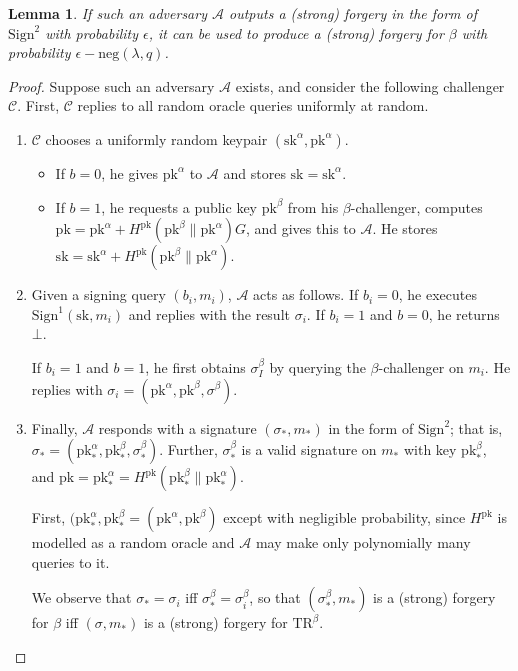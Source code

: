 \documentclass[letterpaper]{article}
\newtheorem{lmma}{Lemma}
\newcommand{\TR}[1]{\mathrm{TR}^{#1}}
\newcommand{\Sign}{\mathrm{Sign}}
\newcommand{\sk}{\mathrm{sk}}
\newcommand{\pk}{\mathrm{pk}}
\newcommand{\negl}{\mathrm{neg}}
\begin{document}
\begin{lmma} If such an adversary $\mathcal{A}$ outputs a (strong) forgery in
the form of $\Sign^2$ with probability $\epsilon$, it can be used to produce a
(strong) forgery for $\beta$ with probability $\epsilon-\negl(\lambda,q)$.
\end{lmma}

\begin{proof} Suppose such an adversary $\mathcal{A}$ exists, and consider the
following challenger $\mathcal{C}$. First, $\mathcal{C}$ replies to all random
oracle queries uniformly at random.
\begin{enumerate}
\item $\mathcal{C}$ chooses a uniformly random keypair $(\sk^\alpha, \pk^\alpha)$.
\begin{itemize}
\item If $b=0$, he gives $\pk^\alpha$ to $\mathcal{A}$ and stores $\sk=\sk^\alpha$.
\item If $b=1$, he requests a public key $\pk^\beta$ from his $\beta$-challenger,
computes $\pk=\pk^\alpha+ H^\pk(\pk^\beta\|\pk^\alpha)G$, and gives this to $\mathcal{A}$.
He stores $\sk=\sk^\alpha+H^\pk(\pk^\beta\|\pk^\alpha)$.
\end{itemize}

\item Given a signing query $(b_i,m_i)$, $\mathcal{A}$ acts as follows. If $b_i=0$,
he executes $\Sign^1(\sk,m_i)$ and replies with the result $\sigma_i$. If $b_i=1$ and
$b=0$, he returns $\bot$.

If $b_i=1$ and $b=1$, he first obtains $\sigma^\beta_I$ by querying the
$\beta$-challenger on $m_i$. He replies with $\sigma_i=(\pk^\alpha,\pk^\beta,\sigma^\beta)$.

\item Finally, $\mathcal{A}$ responds with a signature $(\sigma_*, m_*)$ in the
form of $\Sign^2$; that is, $\sigma_* = (\pk^\alpha_*, \pk^\beta_*, \sigma^\beta_*)$.
Further, $\sigma^\beta_*$ is a valid signature on $m_*$
with key $\pk^\beta_*$, and $\pk = \pk^\alpha_* = H^\pk(\pk^\beta_*\|\pk^\alpha_*)$.

First, $(\pk^\alpha_*, \pk^\beta_* = (\pk^\alpha, \pk^\beta)$ except with negligible
probability, since $H^\pk$ is modelled as a random oracle and $\mathcal{A}$ may make
only polynomially many queries to it.

We observe that $\sigma_* = \sigma_i$ iff $\sigma^\beta_* = \sigma^\beta_i$, so that
$(\sigma^\beta_*, m_*)$ is a (strong) forgery for $\beta$ iff $(\sigma, m_*)$ is a
(strong) forgery for $\TR\beta$.
\end{enumerate}
\end{proof}
\end{document}
